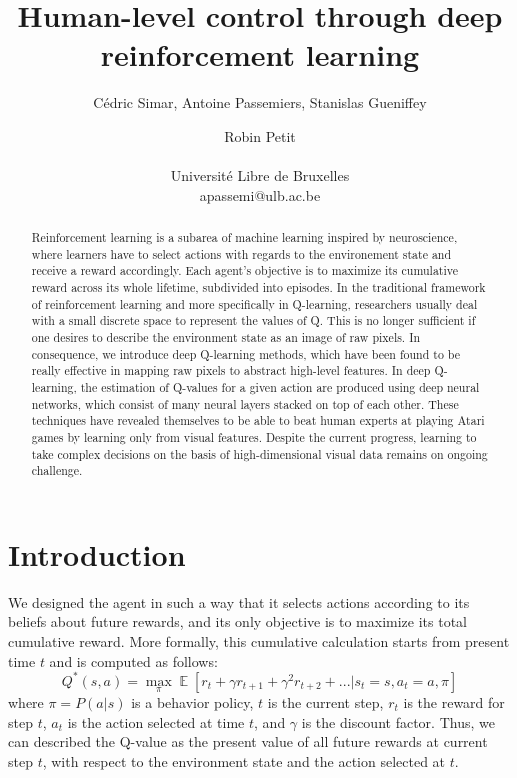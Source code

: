 \documentclass[letterpaper]{article}
\title{Human-level control through deep reinforcement learning}
\author{C\'{e}dric Simar, Antoine Passemiers, Stanislas Gueniffey \and Robin Petit \\
\mbox{}\\
Universit\'{e} Libre de Bruxelles \\
apassemi@ulb.ac.be}
\begin{document}
\maketitle

\begin{abstract}

  Reinforcement learning is a subarea of machine learning inspired by neuroscience, where learners have to select actions with
  regards to the environement state and receive a reward accordingly. Each agent's objective is to maximize its cumulative reward across its whole lifetime,
  subdivided into episodes. In the traditional framework of reinforcement learning and more specifically in Q-learning,
  researchers usually deal with a small discrete space to represent the values of Q. This is no longer sufficient if one desires to describe the environment state
  as an image of raw pixels. In consequence, we introduce deep Q-learning methods, which have been found to be really effective in mapping raw pixels
  to abstract high-level features. In deep Q-learning, the estimation of Q-values for a given action are produced using deep neural networks,
  which consist of many neural layers stacked on top of each other. 
  These techniques have revealed themselves to be able to beat human experts at playing Atari games 
  by learning only from visual features. Despite the current progress, learning to take complex decisions on the basis of high-dimensional visual data remains on
  ongoing challenge.

\end{abstract}

\section{Introduction}

We designed the agent in such a way that it selects actions according to its beliefs about future rewards, and its only objective is to maximize its total
cumulative reward. More formally, this cumulative calculation starts from present time $t$ and is computed as follows:
\[
  Q^{*}(s, a) = \max_{\pi} \mathop{\mathbb{E}}[ r_t + \gamma r_{t+1} + \gamma^2 r_{t+2} + ... | s_t = s, a_t = a, \pi]
\]
where $\pi = P(a | s)$ is a behavior policy, $t$ is the current step, $r_t$ is the reward for step $t$, $a_t$ is the action selected at time $t$, 
and $\gamma$ is the discount factor. Thus, we can described the Q-value as the present value of all future rewards at current step $t$,
with respect to the environment state and the action selected at $t$.
\end{document}
